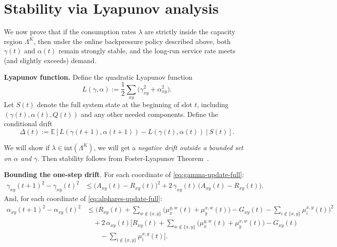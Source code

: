 \documentclass[11pt]{article}
\newcommand{\E}{\mathbb{E}}
\begin{document}
\section{Stability via Lyapunov analysis}

We now prove that if the consumption rates $\lambda$ are strictly inside the capacity region $\Lambda^K$, then under the online backpressure policy described above, both $\gamma(t)$ and $\alpha(t)$ remain strongly stable, and the long-run service rate meets (and slightly exceeds) demand.

\textbf{Lyapunov function.} Define the quadratic Lyapunov function
\begin{equation}
L(\gamma,\alpha)
:= \frac12 \sum_{xy}
\Big(
\gamma_{xy}^2 + \alpha^2_{xy}
\Big).
\label{eq:Lyap-def}
\end{equation}
Let $S(t)$ denote the full system state at the beginning of slot $t$, including $(\gamma(t),\alpha(t),Q(t))$ and any other needed components.
Define the conditional drift
\begin{equation}
\Delta(t)
:= \E\!\left[
L(\gamma(t{+}1),\alpha(t{+}1))
-
L(\gamma(t),\alpha(t))
\ \big|\ S(t)
\right].
\label{eq:drift-def}
\end{equation}

We will show if $\lambda\in\mathrm{int}(\Lambda^K)$,  we will get a \emph{negative drift outside a bounded set on $\alpha$ and $\gamma$}. Then stability follows from Foster-Lyapunov Theorem~\cite{meyn2012markov}. 

\textbf{Bounding the one-step drift}. For each coordinate of \eqref{eq:gamma-update-full}:
\begin{equation}
\begin{aligned}
\gamma_{xy}(t{+}1)^2 - \gamma_{xy}(t)^2
&\le
\big(A_{xy}(t)-R_{xy}(t)\big)^2
+ 2\,\gamma_{xy}(t)\,\big(A_{xy}(t)-R_{xy}(t)\big).
\end{aligned}
\label{eq:gamma-square-step}
\end{equation}
And, for each coordinate of \eqref{eq:alphares-update-full}:
\begin{equation}
\begin{aligned}
\alpha_{xy}(t{+}1)^2
- \alpha_{xy}(t)^2
&\le
\Big(
R_{xy}(t)
+ \sum_{w\notin\{x,y\}}\big(\mu_x^{y,w}(t)+\mu_y^{x,w}(t)\big)
- G_{xy}(t) 
- \sum_{i\notin\{x,y\}}\mu_i^{x,y}(t)
\Big)^2 \\
&\quad
+ 2\,\alpha_{xy}(t)\Big[
R_{xy}(t)
+ \sum_{w\notin\{x,y\}}\big(\mu_x^{y,w}(t)+\mu_y^{x,w}(t)\big)
- G_{xy}(t) \\
&\qquad
- \sum_{i\notin\{x,y\}}\mu_i^{x,y}(t)
\Big].
\end{aligned}
\label{eq:alphares-square-step}
\end{equation}
\end{document}
